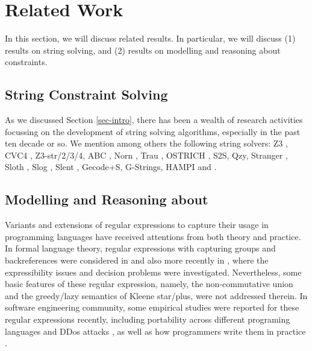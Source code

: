 \section{Related Work}
\label{sec-related}

In this section, we will discuss related results. In particular, we will discuss
(1) results on string solving, and (2) results on modelling and reasoning about 
\regexp{} constraints. 

\subsection{String Constraint Solving}
As we discussed Section \ref{sec-intro}, there has been a wealth of research
activities focussing on the development of string solving algorithms, especially
in the past ten decade or so. We mention among others the following string
solvers:
Z3 \cite{Z3}, CVC4 \cite{cvc4}, Z3-str/2/3/4, ABC \cite{ABC}, Norn
\cite{Abdulla14}, Trau \cite{Z3-trau,AbdullaACDHRR18-trau,Abdulla17}, OSTRICH
\cite{CHL+19}, S2S, Qzy, Stranger \cite{Stranger}, Sloth
\cite{HJLRV18,AbdullaA+19},
Slog \cite{fang-yu-circuits}, Slent \cite{WC+18}, Gecode+S, G-Strings, HAMPI
and 
\cite{HAMPI}. %

\subsection{Modelling and Reasoning about \regexp{}}

Variants and extensions of regular expressions to capture their usage in programming languages have received attentions %
from both theory and practice. In formal language theory, regular expressions with capturing groups and backreferences were considered in \cite{CSY03,CN09} and also more recently in \cite{Freydenberger13,Schmid16,BM17b,FS19}, where the expressibility issues and decision problems were investigated. Nevertheless, some basic features of these regular expression, namely, the non-commutative union and the greedy/lazy semantics of Kleene star/plus, were not addressed therein. In software engineering community, %
some empirical studies were reported for these regular expressions recently, including portability across different programing languages \cite{DMC+19} and DDos attacks \cite{SP18}, as well as how programmers write them in practice \cite{MDD+19}.


